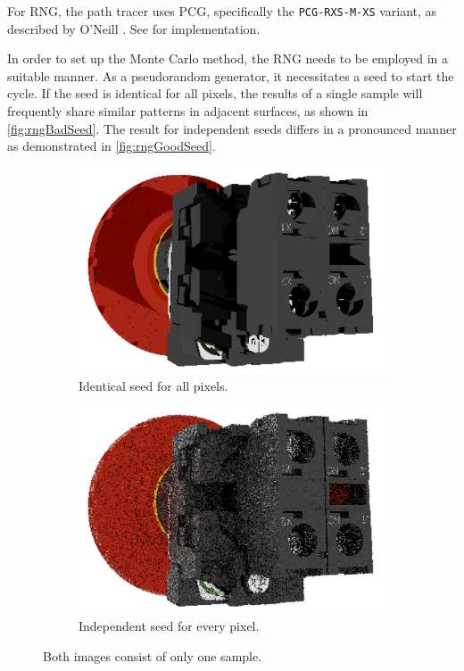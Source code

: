 For \gls{RNG}, the path tracer uses \gls{PCG}, specifically the \texttt{PCG-RXS-M-XS} variant, as described by O’Neill \cite{o2014pcg}. See  for implementation.

In order to set up the Monte Carlo method, the \gls{RNG} needs to be employed in a suitable manner. As a pseudorandom generator, it necessitates a seed to start the cycle. If the seed is identical for all pixels, the results of a single sample will frequently share similar patterns in adjacent surfaces, as shown in \autoref{fig:rngBadSeed}. The result for independent seeds differs in a pronounced manner as demonstrated in \autoref{fig:rngGoodSeed}.

\begin{figure}[H]
    \centering
    \begin{subfigure}[b]{0.45\textwidth}
        \includegraphics[width=\textwidth]{resources/single-sample-bad-seed.png}
        \caption{Identical seed for all pixels.}
        \label{fig:rngBadSeed}
    \end{subfigure}
    \hfill
    \begin{subfigure}[b]{0.45\textwidth}
        \includegraphics[width=\textwidth]{resources/single-sample-good-seed.png}
        \caption{Independent seed for every pixel.}
        \label{fig:rngGoodSeed}
    \end{subfigure}
    \caption{Both images consist of only one sample.}
    \label{fig:rngSeed}
\end{figure}

